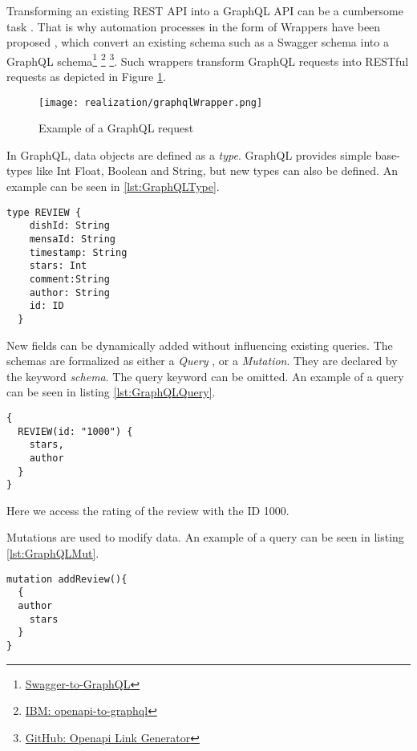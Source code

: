 Transforming an existing REST API into a GraphQL API can be a cumbersome task \cite{WCL18}. That is why automation processes in the form of Wrappers have been proposed \cite{KKK20}, which convert an existing schema such as a Swagger schema into a GraphQL schema\footnote{\href{https://github.com/yarax/swagger-to-graphql}{Swagger-to-GraphQL}} \footnote{\href{https://github.com/IBM/openapi-to-graphql}{IBM: openapi-to-graphql}} \footnote{\href{https://github.com/rwth-acis/openapi-link-generator}{GitHub: Openapi Link Generator}}.   Such wrappers transform GraphQL requests into RESTful requests as depicted in Figure \ref{fig:graphqlWrapper}.
\begin{figure}
    \centering
    \texttt{[image: realization/graphqlWrapper.png]}
    \caption{Example of a GraphQL request}
    \label{fig:graphqlWrapper}
\end{figure}

In GraphQL, data objects are defined as a \emph{type}. GraphQL provides simple base-types like Int Float, Boolean and String, but new types can also be defined. An example can be seen in \ref{lst:GraphQLType}. \\
\begin{lstlisting}[caption={Example of a GraphQL schema},captionpos=b,label={lst:GraphQLType}]
  type REVIEW { 
    dishId: String 
    mensaId: String 
    timestamp: String 
    stars: Int 
    comment:String
    author: String 
    id: ID 
  }
\end{lstlisting}
New fields can be dynamically added without influencing existing queries. The schemas are formalized as either a \emph{Query }, or a \emph{Mutation}. They are declared by the keyword \emph{schema}. The query keyword can be omitted. An example of a query can be seen in listing \ref{lst:GraphQLQuery}.
\begin{lstlisting}[caption={Example of a GraphQL Query},captionpos=b,label={lst:GraphQLQuery}]
{
  REVIEW(id: "1000") {
    stars,
    author
  }
}
\end{lstlisting}
Here we access the rating of the review with the ID 1000.

Mutations are used to modify data. An example of a query can be seen in listing \ref{lst:GraphQLMut}.
\begin{lstlisting}[caption={Example of a GraphQL Mutation},captionpos=b,label={lst:GraphQLMut}]
mutation addReview(){
  {
  author
	stars 
  }
}
\end{lstlisting}

